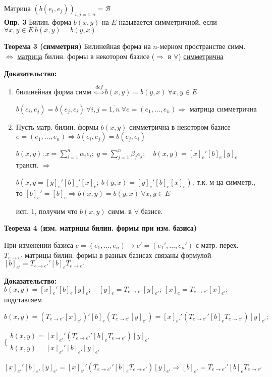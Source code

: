 Матрица $\left( b(e_i, e_j) \right)_{i,j=\overline{1,n}} = \mathcal{B}$\\

\textbf{Опр. 3} Билин. форма $b(x,y)$ на $E$ называется симметричной, если $\forall x,y \in E\ b(x,y) = b(y,x)$

\textbf{Теорема 3 (симметрия)} Билинейная форма на $n$-мерном пространстве симм. $\Leftrightarrow$ \underline{матрица} билин. формы в некотором базисе ($\Rightarrow$ в $\forall$) \underline{симметрична}

\textbf{Доказательство:}
\begin{enumerate}
 \item билинейная форма симм $\overset{def} \Leftrightarrow b(x,y) = b(y,x)\ \forall x,y \in E$

    $b(e_i, e_j) = b(e_j, e_i)\ \forall i,j = \overline{1,n}\ \forall e=(e_1,\ldots,e_n) \Rightarrow$ матрица симметрична

 \item Пусть матр. билин. формы $b(x,y)$ симметрична в некотором базисе $e=(e_1,\ldots, e_n) \Rightarrow b(e_i, e_j) = b(e_j, e_i)$

    $b(x,y): x = \sum\limits_{i=1}^n \alpha_i e_i;\ y = \sum\limits_{j=1}^n \beta_j e_j;\quad b(x,y) = [x]_e' [b]_e [y]_e$ трансп. $\Rightarrow $

    $b(x,y = [y]_e' [b]_e' [x]_e;\ b(y,x) = [y]_e' [b]_e [x]_e);\ $т.к. м-ца симметр., то $[b]_e' = [b]_e \Rightarrow b(x,y) = b(y,x)\ \forall x,y\in E$

    исп. 1, получим что $b(x,y)$ симм. в $\forall$ базисе.
\end{enumerate}

\textbf{Теорема 4 (изм. матрицы билин. формы при изм. базиса)}

При изменении базиса $e=(e_1,\ldots,e_n) \to e' = (e_1',\ldots, e_n')$ с матр. перех. $T_{e\to e'}$ матрицы билин. формы в разных базисах связаны формулой $[b]_{e'} = T_{e\to e'}' [b]_e T_{e\to e'}$

\textbf{Доказательство: } $b(x,y) = [x]_e' [b]_e [y]_e;\quad [y]_e = T_{e\to e'}[y]_{e'};\ [x]_e = T_{e\to e'} [x]_{e'}; $ подставляем

$b(x,y) = \left( T_{e\to e'} [x]_{e'} \right)' [b]_e \left( T_{e\to e'}[y]_{e'} \right) = [x]_{e'}' \left( T_{e\to e'}' [b]_e T_{e\to e'} \right) [y]_{e'};$

$\Bigg\{ \begin{matrix} b(x,y) = [x]_{e'}' \left( T_{e\to e'}' [b]_e T_{e\to e'} \right) [y]_{e'} \\ b(x,y) = [x]_{e'}' [b]_{e'} [y]_{e'} \end{matrix} $ 

$[x]_{e'}' [b]_{e'} [y]_{e'} = [x]_{e'}' \left( T_{e\to e'}' [b]_e T_{e\to e'} \right) [y]_{e'} \Rightarrow [b]_{e'} = T_{e\to e'}' [b]_e T_{e\to e'}$

  


